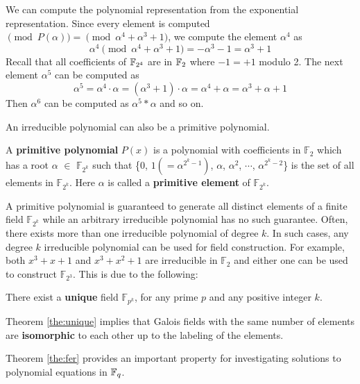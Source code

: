 \begin{Example}
We can compute the polynomial representation from the exponential representation.
Since every element is computed $\pmod{P(\alpha)} = \pmod{\alpha^4+\alpha^3+1}$, 
we compute the element $\alpha^{4}$ as 
\begin{equation}
\alpha^{4} \pmod{ \alpha^4+\alpha^3+1} = -\alpha^3 - 1 = \alpha^3+1
\end{equation}
Recall that all coefficients of ${\mathbb{F}}_{2^4}$ 
are in ${\mathbb{F}}_{2}$ where $-1 = +1$ modulo 2.
The next element $\alpha^{5}$ can be computed as 
\begin{equation}
\alpha^{5} = \alpha^{4}\cdot \alpha = (\alpha^3+1)\cdot \alpha = \alpha^4+\alpha = \alpha^3+\alpha+1 
\end{equation}
Then $\alpha^6$ can be computed as $\alpha^{5}*\alpha$ and so on.
\end{Example}

An irreducible polynomial can also be a primitive polynomial.

\begin{Definition}
A {\bf primitive polynomial} $P(x)$ is a polynomial with coefficients in $\mathbb{F}_2$ 
which has a root $\alpha$ $\in$ $\mathbb{F}_{2^k}$
such that \{$0$, $1(=\alpha^{{2^k}-1})$, $\alpha$, $\alpha^2$, $\cdots$, $\alpha^{2^k-2}$\} is the set of 
all elements in $\mathbb{F}_{2^k}$.
Here $\alpha$ is called a {\bf primitive element} of $\mathbb{F}_{2^k}$. 
\end{Definition}

A primitive polynomial is guaranteed to generate all distinct elements 
of a finite field $\mathbb{F}_{2^k}$ while an arbitrary irreducible polynomial
has no such guarantee.
Often, there exists more than one irreducible polynomial of degree $k$.
In such cases, any degree $k$ irreducible polynomial can be 
used for field construction. For example, both $x^3+x+1$ and $x^3+x^2+1$ 
are irreducible in $\mathbb{F}_2$ and either one can be used
to construct $\mathbb{F}_{2^3}$. This is due to the following:

\begin{Theorem}\label{the:unique}
There exist a {\bf unique} field $\mathbb{F}_{p^k}$, for any prime $p$ and any positive integer $k$.
\end{Theorem}

Theorem \ref{the:unique} implies that Galois fields with the same number of elements are 
{\bf isomorphic} to each other up to the labeling of the elements. 

Theorem \ref{the:fer} provides an important property for investigating solutions to
polynomial equations in ${\mathbb{F}}_{q}$.

